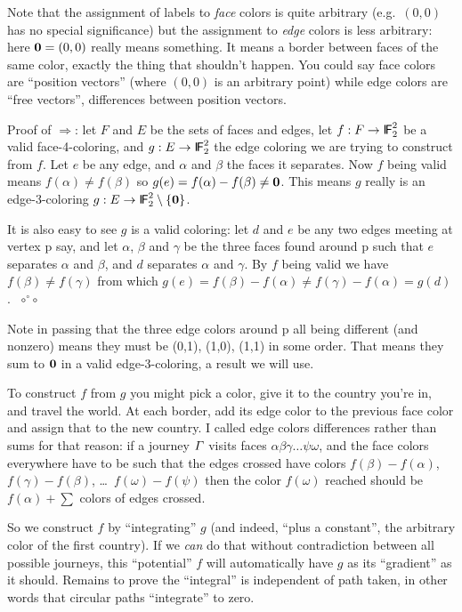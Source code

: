 \documentclass[12pt]{article}
\let\S\scriptstyle
\let\SS\scriptscriptstyle
\def\sfmath#1{{\mathchoice%
{{\sf #1}}{{\sf #1}}{{\S\sf #1}}{{\SS\sf #1}}}}
\def\Stalkset#1{\sfmath{I\kern-.12em#1}}
\def\Fset{\Stalkset F}
\let\so\Longrightarrow
\def\qed{ ${\S\circ}\!{}^\circ\!{\S\circ}$}
\begin{document}
Note that the assignment of labels to {\em face\/} colors is quite
arbitrary (e.g.\ $(0,0)$ has no special significance) but the
assignment to {\em edge\/} colors is less arbitrary: here ${\bf0}=(0,0)$ really
means something. It means a border between faces of the same color, exactly
the thing that shouldn't happen. You could say face colors are
``position vectors'' (where $(0,0)$ is an arbitrary point) while
edge colors are ``free vectors'', differences between position vectors.

Proof of $\so$: let $F$ and $E$ be the sets of faces and edges,
let $f : F\to\Fset_2^2$ be a valid face-4-coloring, and
$g : E\to\Fset_2^2$ the edge coloring we are trying to construct from $f$.
Let $e$ be any edge, and $\alpha$ and $\beta$ the faces it separates. Now
$f$ being valid means $f(\alpha)\ne f(\beta)$ so $g(e) = f(\alpha) - f(\beta)
\ne {\bf0}$. This means $g$ really is an edge-3-coloring
$g : E\to\Fset_2^2\setminus\{{\bf0}\}$.

It is also easy to see $g$ is a valid coloring: let $d$ and $e$ be any two
edges meeting at vertex {\sc p} say, and let $\alpha$, $\beta$ and $\gamma$
be the three faces found around {\sc p} such that $e$ separates $\alpha$
and $\beta$, and $d$ separates $\alpha$ and $\gamma$. By $f$ being valid we
have $f(\beta)\ne f(\gamma)$ from which
$g(e) = f(\beta)-f(\alpha) \ne f(\gamma)-f(\alpha) = g(d)$.~\qed

\vfill\pagebreak
Note in passing that the three edge colors around {\sc p} all being different
(and nonzero) means they must be (0,1), (1,0), (1,1) in some order. That means
they sum to ${\bf0}$ in a valid edge-3-coloring, a result we will use.

To construct $f$ from $g$ you might pick a color, give it to the country
you're in, and travel the world. At each border, add its edge color to the
previous face color and assign that to the new country. I called edge colors
differences rather than sums for that reason: if a journey ${\mit\Gamma}$
visits faces $\alpha\beta\gamma\dots\psi\omega$, and the face colors everywhere
have to be such that the edges crossed have colors $f(\beta)-f(\alpha)$,
$f(\gamma)-f(\beta)$, \dots\ $f(\omega)-f(\psi)$ then the color
$f(\omega)$ reached should be $f(\alpha) + \sum$ colors of edges crossed.

So we construct $f$ by ``integrating'' $g$ (and indeed, ``plus a constant'',
the arbitrary color of the first country). If we {\em can\/} do that without
contradiction between all possible journeys, this ``potential'' $f$ will
automatically have $g$ as its ``gradient'' as it should. Remains to prove
the ``integral'' is independent of path taken, in other words that circular
paths ``integrate'' to zero.
\end{document}
